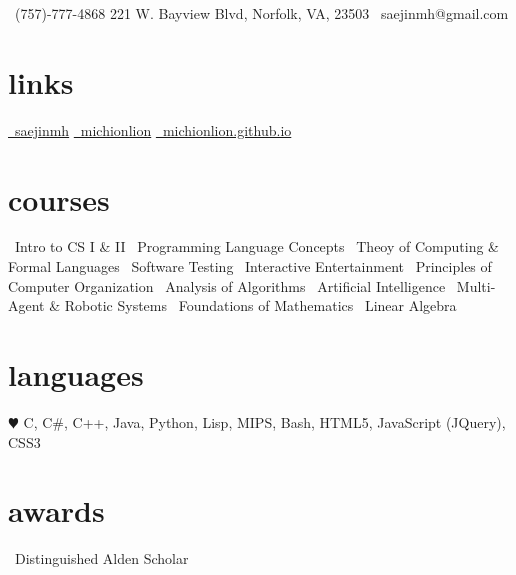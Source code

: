 \documentclass[]{friggeri-cv}
\begin{document}
       {\faMobilePhone\ (757)-777-4868 \hspace{1cm} 221 W. Bayview Blvd, Norfolk, VA, 23503 \hspace*{1cm} \faEnvelope\ saejinmh@gmail.com}

\begin{aside}
  \section{links}
    \href{https://www.linkedin.com/in/saejinmh}{\faLinkedin\ saejinmh}
    \href{https://github.com/Michionlion}{\faGithub\ michionlion}
    \href{https://michionlion.github.io}{\faGlobe\ michionlion.github.io}
  \section{courses}
	\bullet\ Intro to CS I \& II\vspace{0.1cm}
	\bullet\ Programming Language Concepts\vspace{0.1cm}
	\bullet\ Theoy of Computing \& Formal Languages\vspace{0.1cm}	
	\bullet\ Software Testing\vspace{0.1cm}
	\bullet\ Interactive Entertainment\vspace{0.1cm}
	\bullet\ Principles of Computer Organization\vspace{0.1cm}
    \bullet\ Analysis of Algorithms\vspace{0.1cm}
    \bullet\ Artificial Intelligence\vspace{0.1cm}
    \bullet\ Multi-Agent \& Robotic Systems\vspace{0.1cm}
    \bullet\ Foundations of Mathematics\vspace{0.1cm}
    \bullet\ Linear Algebra\vspace{0.1cm}
  \section{languages}
    {\color{red} $\varheartsuit$} C, C\#, C++, Java, Python, Lisp, MIPS, Bash, HTML5, JavaScript (JQuery), CSS3\vspace{0.1cm}
  \section{awards}
    \bullet\ Distinguished Alden Scholar\vspace{0.1cm}
\end{aside}
\end{document}
